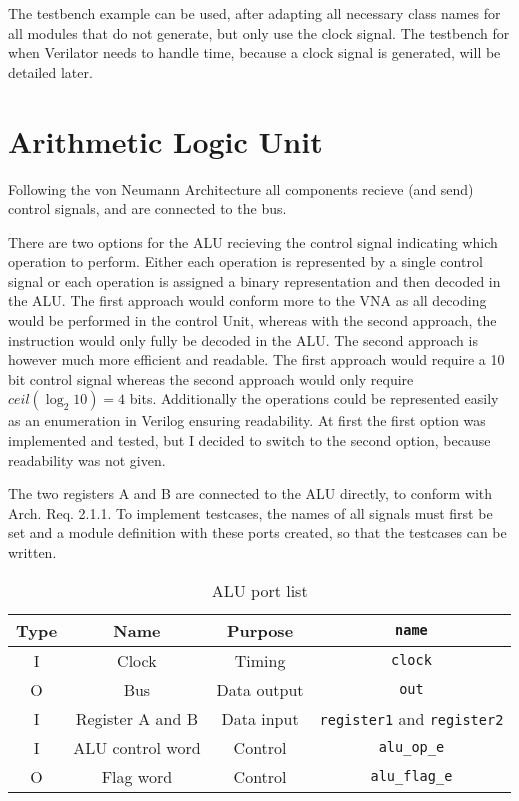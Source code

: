 The testbench example can be used, after adapting all necessary class names for all modules that do not generate, but only use the clock signal. The testbench 
for when Verilator needs to handle time, because a clock signal is generated, will be detailed later.

\section{Arithmetic Logic Unit}
Following the von Neumann Architecture all components recieve (and send) control signals, and are connected to the bus. 

There are two options for the ALU recieving the control signal indicating which operation to perform. Either each operation is represented by a single control signal or each operation is assigned a binary representation and then decoded in the ALU. The first approach would conform more to the VNA as all decoding would be performed in the control Unit, whereas with the second approach, the instruction would only fully be decoded in the ALU. The second approach is however much more efficient and readable. The first approach would require a 10 bit control signal whereas the second approach would only require $ceil(\log_2 10) = 4$ bits. Additionally the operations could be represented easily as an enumeration in Verilog ensuring readability. At first the first option was implemented and tested, but I decided to switch to the second option, because readability was not given. 

The two registers A and B are connected to the ALU directly, to conform with Arch. Req. 2.1.1. To implement testcases, the names of all signals must first be set and a module definition with these ports created, so that the testcases can be written.

\begin{table}[H]
\begin{tabular}{cccc}
  Type& Name & Purpose & \texttt{name}\\ \hline
  I   & Clock & Timing & \texttt{clock}\\
  O   & Bus     & Data output & \texttt{out}        \\
  I   & Register A and B & Data input & \texttt{register1} and \texttt{register2} \\
  I   & ALU control word & Control & \texttt{alu\_op\_e}\\
O   & Flag word & Control & \texttt{alu\_flag\_e}
\end{tabular}
\caption{ALU port list}
\label{tab:alu-i/o}
\end{table}

